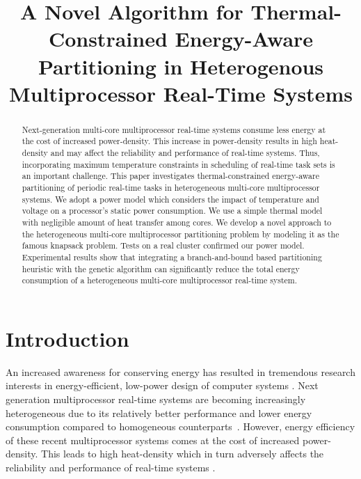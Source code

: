 \documentclass[conference]{IEEEtran}
\begin{document}
\title{\LARGE A Novel Algorithm for Thermal-Constrained Energy-Aware Partitioning in Heterogenous Multiprocessor Real-Time Systems}

\author{
 }


\maketitle


\begin{abstract}
Next-generation multi-core multiprocessor real-time systems consume less energy at the cost of increased power-density.
This increase in power-density results in high
heat-density and may affect the reliability and performance of real-time systems. Thus, incorporating maximum temperature
constraints in scheduling of real-time task sets is an important challenge.
This paper investigates thermal-constrained energy-aware %
partitioning of periodic real-time tasks in heterogeneous multi-core
multiprocessor systems. We adopt a power model which considers the impact of temperature and voltage on a processor's static power consumption.
We use a simple thermal model with negligible amount of heat
transfer among cores.
We develop a novel approach to the heterogeneous multi-core multiprocessor partitioning problem by modeling it as the famous knapsack problem.
Tests on a real cluster confirmed our power model.
Experimental results show that integrating a branch-and-bound based partitioning heuristic with the genetic algorithm %
can significantly
reduce the  total energy consumption of a heterogeneous multi-core multiprocessor real-time system.
\end{abstract}


\section{Introduction}

An increased awareness for conserving energy has resulted in tremendous research interests in energy-efficient, %
low-power design of computer systems \cite{Chen09}.
Next generation multiprocessor real-time systems are becoming
increasingly heterogeneous due to its relatively better performance and lower energy consumption compared to homogeneous counterparts~\cite{Kumar06}.
However, energy efficiency of these recent multiprocessor systems comes at the cost of increased power-density.
This leads to  high heat-density which  in turn adversely affects the reliability and
performance of real-time systems \cite{Wang10}.
\end{document}

